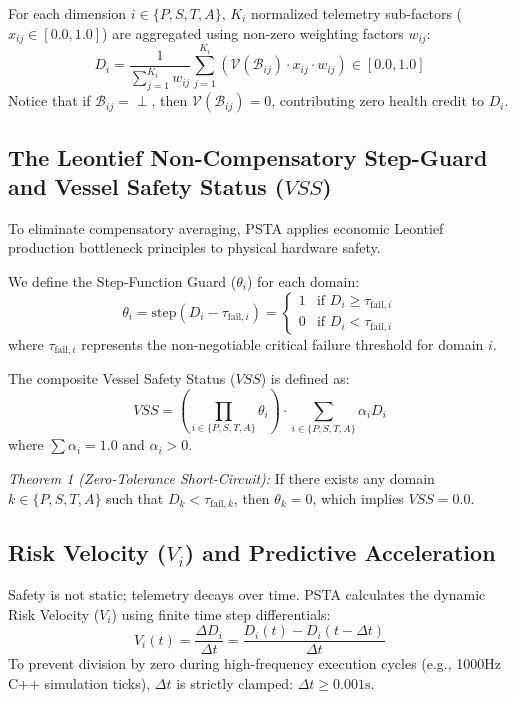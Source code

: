 \documentclass[journal]{IEEEtran}
\begin{document}
For each dimension $i \in \{P, S, T, A\}$, $K_i$ normalized telemetry sub-factors ($x_{ij} \in [0.0, 1.0]$) are aggregated using non-zero weighting factors $w_{ij}$:
\begin{equation}
D_i = \frac{1}{\sum_{j=1}^{K_i} w_{ij}} \sum_{j=1}^{K_i} \left( \mathcal{V}(\mathcal{B}_{ij}) \cdot x_{ij} \cdot w_{ij} \right) \in [0.0, 1.0]
\end{equation}
Notice that if $\mathcal{B}_{ij} = \perp$, then $\mathcal{V}(\mathcal{B}_{ij}) = 0$, contributing zero health credit to $D_i$.

\subsection{The Leontief Non-Compensatory Step-Guard and Vessel Safety Status ($VSS$)}
To eliminate compensatory averaging, PSTA applies economic Leontief production bottleneck principles to physical hardware safety.

We define the Step-Function Guard ($\theta_i$) for each domain:
\begin{equation}
\theta_i = \text{step}(D_i - \tau_{\text{fail}, i}) = \begin{cases} 1 & \text{if } D_i \ge \tau_{\text{fail}, i} \\ 0 & \text{if } D_i < \tau_{\text{fail}, i} \end{cases}
\end{equation}
where $\tau_{\text{fail}, i}$ represents the non-negotiable critical failure threshold for domain $i$.

The composite Vessel Safety Status ($VSS$) is defined as:
\begin{equation}
VSS = \left( \prod_{i \in \{P, S, T, A\}} \theta_i \right) \cdot \sum_{i \in \{P, S, T, A\}} \alpha_i D_i
\end{equation}
where $\sum \alpha_i = 1.0$ and $\alpha_i > 0$.

\emph{Theorem 1 (Zero-Tolerance Short-Circuit):} If there exists any domain $k \in \{P, S, T, A\}$ such that $D_k < \tau_{\text{fail}, k}$, then $\theta_k = 0$, which implies $VSS = 0.0$.

\subsection{Risk Velocity ($V_i$) and Predictive Acceleration}
Safety is not static; telemetry decays over time. PSTA calculates the dynamic Risk Velocity ($V_i$) using finite time step differentials:
\begin{equation}
V_i(t) = \frac{\Delta D_i}{\Delta t} = \frac{D_i(t) - D_i(t - \Delta t)}{\Delta t}
\end{equation}
To prevent division by zero during high-frequency execution cycles (e.g., 1000Hz C++ simulation ticks), $\Delta t$ is strictly clamped: $\Delta t \ge 0.001\text{s}$.
\end{document}

